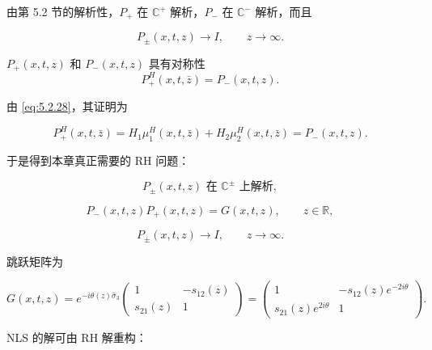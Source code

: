\documentclass[
    lang=cn,
    scheme=chinese,
    mode=simple,
    device=normal,
    color=blue,
    math=cm,
    thmcnt=section,
    12pt
]{elegantbook}
\begin{document}
由第 5.2 节的解析性，$P_+$ 在 $\mathbb{C}^+$ 解析，$P_-$ 在 $\mathbb{C}^-$ 解析，而且

\[
    P_\pm(x,t,z)\to I,\qquad z\to\infty.
\]

\setcounter{theorem}{1}
\begin{theorem}[RH 矩阵的共轭对称]
$P_+(x,t,z)$ 和 $P_-(x,t,z)$ 具有对称性
\begin{equation}
    P_+^H(x,t,\bar z)=P_-(x,t,z).
    \tag{5.3.2}
    \label{eq:5.3.2}
\end{equation}
\end{theorem}

由 \eqref{eq:5.2.28}，其证明为

\begin{equation}
    P_+^H(x,t,\bar z)
    =
    H_1\mu_1^H(x,t,\bar z)
    +
    H_2\mu_2^H(x,t,\bar z)
    =
    P_-(x,t,z).
    \tag{5.3.3}
    \label{eq:5.3.3}
\end{equation}

于是得到本章真正需要的 RH 问题：

\begin{equation}
    P_\pm(x,t,z)\text{ 在 }\mathbb{C}^\pm\text{ 上解析},
    \tag{5.3.4}
    \label{eq:5.3.4}
\end{equation}

\begin{equation}
    P_-(x,t,z)P_+(x,t,z)
    =
    G(x,t,z),
    \qquad z\in\mathbb{R},
    \tag{5.3.5}
    \label{eq:5.3.5}
\end{equation}

\begin{equation}
    P_\pm(x,t,z)\to I,
    \qquad z\to\infty.
    \tag{5.3.6}
    \label{eq:5.3.6}
\end{equation}

跳跃矩阵为

\begin{equation}
    G(x,t,z)
    =
    e^{-i\theta(z)\widehat{\sigma}_3}
    \begin{pmatrix}
        1         & -s_{12}(z) \\
        s_{21}(z) & 1
    \end{pmatrix}=
    \begin{pmatrix}
        1                     & -s_{12}(z)e^{-2i\theta} \\
        s_{21}(z)e^{2i\theta} & 1
    \end{pmatrix}.
    \tag{5.3.7}
    \label{eq:5.3.7}
\end{equation}

NLS 的解可由 RH 解重构：
\end{document}
